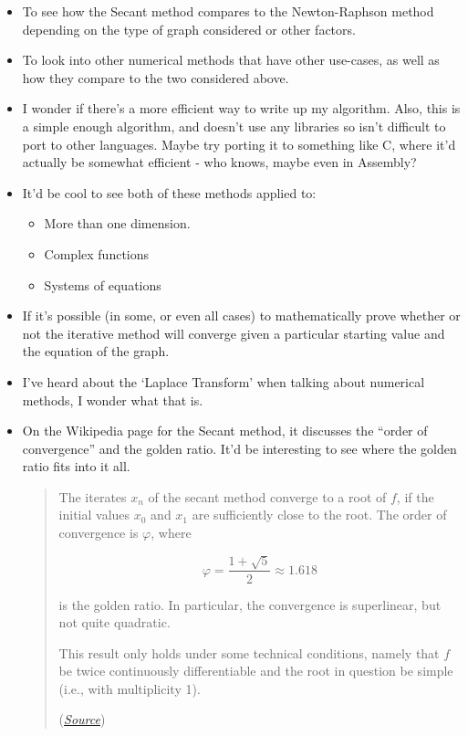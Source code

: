 \documentclass[
]{article}
\begin{document}
\begin{itemize}
\item
  To see how the Secant method compares to the Newton-Raphson method
  depending on the type of graph considered or other factors.
\item
  To look into other numerical methods that have other use-cases, as
  well as how they compare to the two considered above.
\item
  I wonder if there's a more efficient way to write up my algorithm.
  Also, this is a simple enough algorithm, and doesn't use any libraries
  so isn't difficult to port to other languages. Maybe try porting it to
  something like C, where it'd actually be somewhat efficient - who
  knows, maybe even in Assembly?
\item
  It'd be cool to see both of these methods applied to:

  \begin{itemize}
  \item
    More than one dimension.
  \item
    Complex functions
  \item
    Systems of equations
  \end{itemize}
\item
  If it's possible (in some, or even all cases) to mathematically prove
  whether or not the iterative method will converge given a particular
  starting value and the equation of the graph.
\item
  I've heard about the `Laplace Transform' when talking about numerical
  methods, I wonder what that is.
\item
  On the Wikipedia page for the Secant method, it discusses the ``order
  of convergence'' and the golden ratio. It'd be interesting to see
  where the golden ratio fits into it all.

  \begin{quote}
  The iterates \(x_n\) of the secant method converge to a root of \(f\),
  if the initial values \(x_0\) and \(x_1\) are sufficiently close to
  the root. The order of convergence is \(\varphi\), where

  \[\varphi=\frac{1+\sqrt{5}}{2}\approx1.618\]

  is the golden ratio. In particular, the convergence is superlinear,
  but not quite quadratic.

  This result only holds under some technical conditions, namely that
  \(f\) be twice continuously differentiable and the root in question be
  simple (i.e., with multiplicity 1).

  (\href{https://en.wikipedia.org/wiki/Secant_method\#Convergence}{\emph{Source}})
  \end{quote}
\end{itemize}
\end{document}
